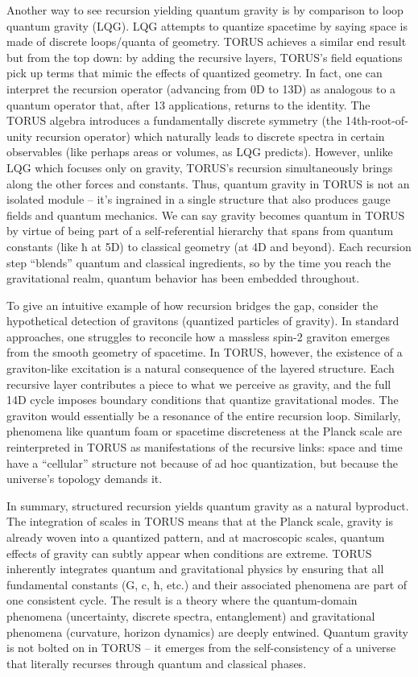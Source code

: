 \documentclass[]{article}
\begin{document}
Another way to see recursion yielding quantum gravity is by comparison
to loop quantum gravity (LQG). LQG attempts to quantize spacetime by
saying space is made of discrete loops/quanta of geometry. TORUS
achieves a similar end result but from the top down: by adding the
recursive layers, TORUS's field equations pick up terms that mimic the
effects of quantized geometry. In fact, one can interpret the recursion
operator (advancing from 0D to 13D) as analogous to a quantum operator
that, after 13 applications, returns to the identity. The TORUS algebra
introduces a fundamentally discrete symmetry (the 14th-root-of-unity
recursion operator) which naturally leads to discrete spectra in certain
observables (like perhaps areas or volumes, as LQG predicts). However,
unlike LQG which focuses only on gravity, TORUS's recursion
simultaneously brings along the other forces and constants. Thus,
quantum gravity in TORUS is not an isolated module -- it's ingrained in
a single structure that also produces gauge fields and quantum
mechanics. We can say gravity becomes quantum in TORUS by virtue of
being part of a self-referential hierarchy that spans from quantum
constants (like ħ at 5D) to classical geometry (at 4D and beyond). Each
recursion step ``blends'' quantum and classical ingredients, so by the
time you reach the gravitational realm, quantum behavior has been
embedded throughout.

To give an intuitive example of how recursion bridges the gap, consider
the hypothetical detection of gravitons (quantized particles of
gravity). In standard approaches, one struggles to reconcile how a
massless spin-2 graviton emerges from the smooth geometry of spacetime.
In TORUS, however, the existence of a graviton-like excitation is a
natural consequence of the layered structure. Each recursive layer
contributes a piece to what we perceive as gravity, and the full 14D
cycle imposes boundary conditions that quantize gravitational modes. The
graviton would essentially be a resonance of the entire recursion loop.
Similarly, phenomena like quantum foam or spacetime discreteness at the
Planck scale are reinterpreted in TORUS as manifestations of the
recursive links: space and time have a ``cellular'' structure not
because of ad hoc quantization, but because the universe's topology
demands it.

In summary, structured recursion yields quantum gravity as a natural
byproduct. The integration of scales in TORUS means that at the Planck
scale, gravity is already woven into a quantized pattern, and at
macroscopic scales, quantum effects of gravity can subtly appear when
conditions are extreme. TORUS inherently integrates quantum and
gravitational physics by ensuring that all fundamental constants (G, c,
ħ, etc.) and their associated phenomena are part of one consistent
cycle. The result is a theory where the quantum-domain phenomena
(uncertainty, discrete spectra, entanglement) and gravitational
phenomena (curvature, horizon dynamics) are deeply entwined. Quantum
gravity is not bolted on in TORUS -- it emerges from the
self-consistency of a universe that literally recurses through quantum
and classical phases.
\end{document}
